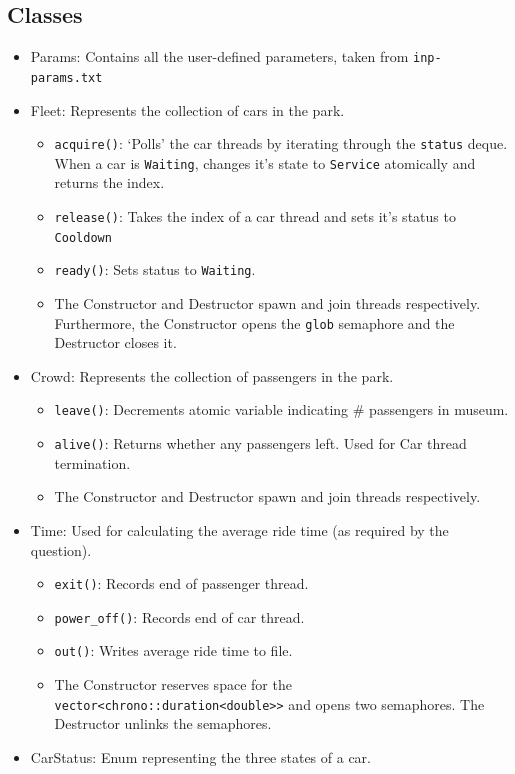 \documentclass{amsart}
\begin{document}
\subsection{Classes}
\begin{itemize}
    \item Params: Contains all the user-defined parameters, taken from \texttt{inp-params.txt}
    \item Fleet: Represents the collection of cars in the park. \begin{itemize}
        \item \texttt{acquire()}: `Polls' the car threads by iterating through the \texttt{status} deque. When a car is \texttt{Waiting}, changes it's state to \texttt{Service} atomically and returns the index.
        \item \texttt{release()}: Takes the index of a car thread and sets it's status to \texttt{Cooldown}
        \item \texttt{ready()}: Sets status to \texttt{Waiting}.
        \item The Constructor and Destructor spawn and join threads respectively. Furthermore, the Constructor opens the \texttt{glob} semaphore and the Destructor closes it.
    \end{itemize}
    \item Crowd: Represents the collection of passengers in the park. \begin{itemize}
        \item \texttt{leave()}: Decrements atomic variable indicating \# passengers in museum.
        \item \texttt{alive()}: Returns whether any passengers left. Used for Car thread termination.
        \item The Constructor and Destructor spawn and join threads respectively.
    \end{itemize}
    \item Time: Used for calculating the average ride time (as required by the question). \begin{itemize}
        \item \texttt{exit()}: Records end of passenger thread.
        \item \texttt{power\_off()}: Records end of car thread.
        \item \texttt{out()}: Writes average ride time to file.
        \item The Constructor reserves space for the \texttt{vector<chrono::duration<double>>} and opens two semaphores. The Destructor unlinks the semaphores.
    \end{itemize}
    \item CarStatus: Enum representing the three states of a car.
\end{itemize}
\end{document}
